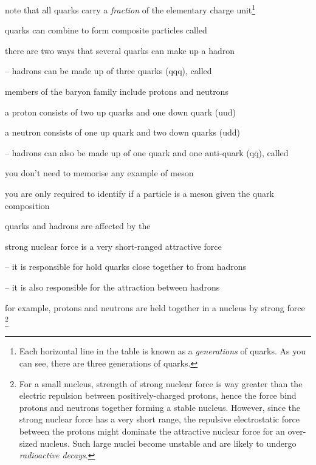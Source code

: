 note that all quarks carry a \emph{fraction} of the elementary charge unit\footnote{Each horizontal line in the table is known as a \emph{generations} of quarks. As you can see, there are three generations of quarks.}

\cmt quarks can combine to form composite particles called  

there are two ways that several quarks can make up a hadron

\begin{compactenum}
	\item[--] hadrons can be made up of three quarks (qqq), called  
	
	members of the baryon family include protons and neutrons
	
	a proton consists of two up quarks and one down quark (uud) 
	
	a neutron consists of one up quark and two down quarks (udd) 
	
	\item[--] hadrons can also be made up of one quark and one anti-quark (q$\bar{\text{q}}$), called  
	
	you don't need to memorise any example of meson
	
	you are only required to identify if a particle is a meson given the quark composition
\end{compactenum}

\cmt quarks and hadrons are affected by the 

strong nuclear force is a very short-ranged attractive force

\begin{compactenum}
	\item[--] it is responsible for hold quarks close together to from hadrons

	\item[--] it is also responsible for the attraction between hadrons
	
	for example, protons and neutrons are held together in a nucleus by strong force
	\footnote{For a small nucleus, strength of strong nuclear force is way greater than the electric repulsion between positively-charged protons, hence the force bind protons and neutrons together forming a stable nucleus. However, since the strong nuclear force has a very short range, the repulsive electrostatic force between the protons might dominate the attractive nuclear force for an over-sized nucleus. Such large nuclei become unstable and are likely to undergo \emph{radioactive decays}.}
\end{compactenum}


